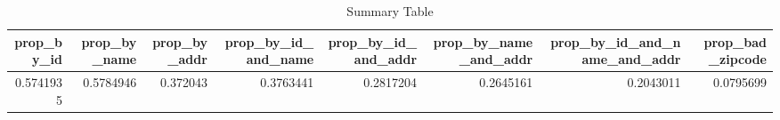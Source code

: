 \begin{table}

\caption{Summary Table}
\centering
\begin{tabular}[t]{rrrrrrrr}
\toprule
prop\_by\_id & prop\_by\_name & prop\_by\_addr & prop\_by\_id\_and\_name & prop\_by\_id\_and\_addr & prop\_by\_name\_and\_addr & prop\_by\_id\_and\_name\_and\_addr & prop\_bad\_zipcode\\
\midrule
0.5741935 & 0.5784946 & 0.372043 & 0.3763441 & 0.2817204 & 0.2645161 & 0.2043011 & 0.0795699\\
\bottomrule
\end{tabular}
\end{table}
